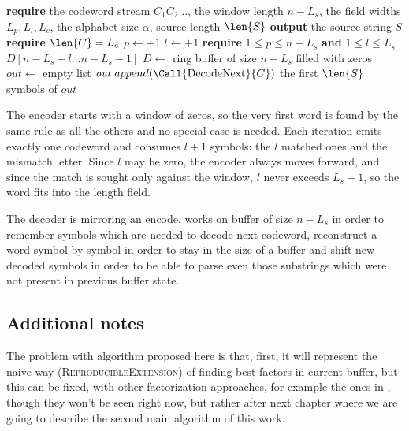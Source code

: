 \begin{algorithm}[H]
\caption{LZ77 decoder}
\label{alg:lz77-decoder}
\begin{algorithmic}[1]
\Statex
\State \textbf{require} the codeword stream \(C_1 C_2 \ldots\), the window length \(n - L_s\), the field widths \(L_p, L_l, L_c\), the alphabet size \(\alpha\), source length \(\len{S}\)
\State \textbf{output} the source string \(S\)
\Statex
{}
    \State \textbf{require} $\len{C} = L_c$
    \State $p \gets {}$$ + 1 $
    \State $l \gets {}$$ + 1$
  \State \textbf{require} $1 \leq p \leq n - L_s$ \textbf{and} $1 \leq l \leq L_s$
    \State {}
  \EndFor
  \State {}
  \State \Return $D[n - L_s - l \ldots n - L_s - 1]$
\EndProcedure
\Statex
{}
  \State $D \gets$ ring buffer of size $ n - L_s$ filled with zeros
  \State $\mathit{out} \gets$ empty list
    \State $\mathit{out}.append(\Call{\text{DecodeNext}}{C})$
  \EndFor
  \State \Return the first $\len{S}$ symbols of $\mathit{out}$
\EndProcedure
\end{algorithmic}
\end{algorithm}

The encoder starts with a window of zeros, so the very first word is found by the same rule as all the others and no special case is needed. Each iteration emits exactly one codeword and consumes \(l + 1\) symbols: the \(l\) matched ones and the mismatch letter. Since \(l\) may be zero, the encoder always moves forward, and since the match is sought only against the window, \(l\) never exceeds \(L_s - 1\), so the word fits into the length field.

The decoder is mirroring an encode, works on buffer of size \(n - L_s\) in order to remember symbols which are needed to decode next codeword, reconstruct a word symbol by symbol in order to stay in the size of a buffer and shift new decoded symbols in order to be able to parse even those substrings which were not present in previous buffer state.

\subsection{Additional notes}
The problem with algorithm proposed here is that, first, it will represent the naive way (\textsc{ReproducibleExtension}) of finding best factors in current buffer, but this can be fixed, with other factorization approaches, for example the ones in , though they won't be seen right now, but rather after next chapter where we are going to describe the second main algorithm of this work.  
